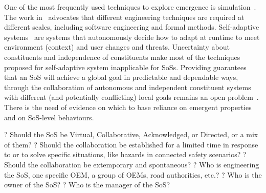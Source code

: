 One of the most frequently used techniques to explore emergence is simulation~\cite{DeWolf2005}. The work in~\cite{Zambonelli04} advocates that different engineering techniques are required at different scales,
including software engineering and formal methods. Self-adaptive systems~\cite{de2013software,Author:2009tt,Salehie2009} are systems that autonomously
decide how to adapt at runtime to meet environment (context) and user changes and threats. Uncertainty about
constituents and independence of constituents make most of the techniques proposed for self-adaptive system
inapplicable for SoSs. Providing guarantees that an SoS will achieve a global goal in predictable and dependable
ways, through the collaboration of autonomous and independent constituent systems with different (and
potentially conflicting) local goals remains an open problem~\cite{Delgado2004,Leucker2009293,ZHANG20185}. There is the need of evidence on which
to base reliance on emergent properties and on SoS-level behaviours.

 




?	Should the SoS be Virtual, Collaborative, Acknowledged, or Directed, or a mix of them?
?	Should the collaboration be established for a limited time in response to or to solve specific situations, like hazards in connected safety scenarios?
?	Should the collaboration be extemporary and spontaneous?
?	Who is engineering the SoS, one specific OEM, a group of OEMs, road authorities, etc.?
?	Who is the owner of the SoS?
?	Who is the manager of the SoS?


